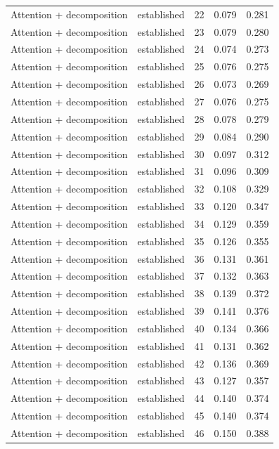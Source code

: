 \begin{tabular}{llrrr}
Attention + decomposition & established & 22 & 0.079 & 0.281 \\
Attention + decomposition & established & 23 & 0.079 & 0.280 \\
Attention + decomposition & established & 24 & 0.074 & 0.273 \\
Attention + decomposition & established & 25 & 0.076 & 0.275 \\
Attention + decomposition & established & 26 & 0.073 & 0.269 \\
Attention + decomposition & established & 27 & 0.076 & 0.275 \\
Attention + decomposition & established & 28 & 0.078 & 0.279 \\
Attention + decomposition & established & 29 & 0.084 & 0.290 \\
Attention + decomposition & established & 30 & 0.097 & 0.312 \\
Attention + decomposition & established & 31 & 0.096 & 0.309 \\
Attention + decomposition & established & 32 & 0.108 & 0.329 \\
Attention + decomposition & established & 33 & 0.120 & 0.347 \\
Attention + decomposition & established & 34 & 0.129 & 0.359 \\
Attention + decomposition & established & 35 & 0.126 & 0.355 \\
Attention + decomposition & established & 36 & 0.131 & 0.361 \\
Attention + decomposition & established & 37 & 0.132 & 0.363 \\
Attention + decomposition & established & 38 & 0.139 & 0.372 \\
Attention + decomposition & established & 39 & 0.141 & 0.376 \\
Attention + decomposition & established & 40 & 0.134 & 0.366 \\
Attention + decomposition & established & 41 & 0.131 & 0.362 \\
Attention + decomposition & established & 42 & 0.136 & 0.369 \\
Attention + decomposition & established & 43 & 0.127 & 0.357 \\
Attention + decomposition & established & 44 & 0.140 & 0.374 \\
Attention + decomposition & established & 45 & 0.140 & 0.374 \\
Attention + decomposition & established & 46 & 0.150 & 0.388 \\

\end{tabular}
